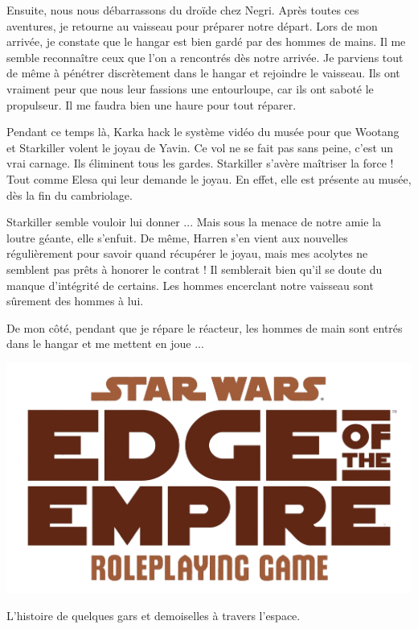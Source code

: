 \documentclass[a4paper,9pt,twoside,twocolumn,openany]{book}
\begin{document}
Ensuite, nous nous débarrassons du droïde chez Negri. Après toutes ces aventures, je retourne au vaisseau pour préparer notre départ. Lors de mon arrivée, je constate que le hangar est bien gardé par des hommes de mains. Il me semble reconnaître ceux que l'on a rencontrés dès notre arrivée. Je parviens tout de même à pénétrer discrètement dans le hangar et rejoindre le vaisseau. Ils ont vraiment peur que nous leur fassions une entourloupe, car ils ont saboté le propulseur. Il me faudra bien une haure pour tout réparer.

Pendant ce temps là, Karka hack le système vidéo du musée pour que Wootang et Starkiller volent le joyau de Yavin.
Ce vol ne se fait pas sans peine, c'est un vrai carnage.
Ils éliminent tous les gardes. Starkiller s'avère maîtriser la force !
Tout comme Elesa qui leur demande le joyau. En effet, elle est présente au musée, dès la fin du cambriolage.

Starkiller semble vouloir lui donner ... Mais sous la menace de notre amie la loutre géante, elle s'enfuit. De même, Harren s'en vient aux nouvelles régulièrement pour savoir quand récupérer le joyau, mais mes acolytes ne semblent pas prêts à honorer le contrat ! Il semblerait bien qu'il se doute du manque d'intégrité de certains. Les hommes encerclant notre vaisseau sont sûrement des hommes à lui.

De mon côté, pendant que je répare le réacteur, les hommes de main sont entrés dans le hangar et me mettent en joue ...

\clearevenpage

\onecolumn
\Large

\centering

\vfill

\includegraphics[width=1\textwidth]{img/SWEotE}


\vfill

L'histoire de quelques gars et demoiselles à travers l'espace.
\vfill

\end{document}
